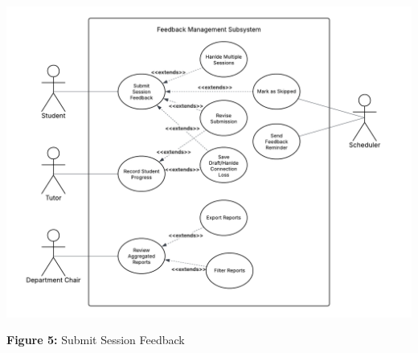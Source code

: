 \begin{center}
\includegraphics[width=0.9\linewidth]{images/UC-04.png}
\end{center}

\begin{center}
\textbf{Figure 5:}  Submit Session Feedback
\end{center}

